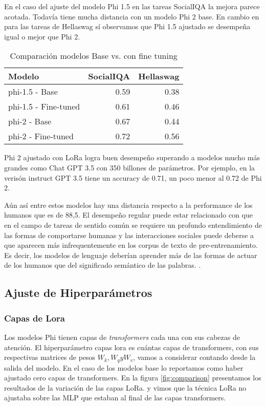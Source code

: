 En el caso del ajuste del modelo Phi 1.5 en las tareas SocialIQA la mejora parece acotada. Todavía tiene mucha distancia con un modelo Phi 2 base. En cambio en para las tareas de Hellaswag sí observamos que Phi 1.5 ajustado se desempeña igual o mejor que Phi 2. \\
\begin{table}[h!]
\centering
\begin{tabular}{lrr}
\toprule
Modelo & SocialIQA & Hellaswag \\
\midrule
phi-1.5 - Base & 0.59 & 0.38 \\
phi-1.5 - Fine-tuned & 0.61 & 0.46 \\
phi-2 - Base & 0.67 & 0.44 \\
phi-2 - Fine-tuned & 0.72 & 0.56 \\
\bottomrule
\end{tabular}

\caption{Comparación modelos Base vs. con fine tuning}
\label{tab:performance_comparison}
\end{table}
Phi 2 ajustado con LoRa logra buen desempeño superando a modelos mucho más grandes como Chat GPT 3.5 con 350 billones de parámetros. Por ejemplo, en la verisón instruct  GPT 3.5 tiene un accuracy de 0.71, un poco menor al 0.72 de Phi 2. 

Aún así entre estos modelos hay una distancia respecto a la performance de los humanos que es de 88,5\cite{bauer2021identify}. El desempeño regular puede estar relacionado con que en el campo de tareas de sentido común se requiere un profundo entendimiento de las formas de comportarse humanas y las interacciones sociales puede deberse a que aparecen más infrequentemente en los corpus de texto de pre-entrenamiento. Es decir, los modelos de lenguaje deberían aprender más de las formas de actuar de los humanos que del significado semántico de las palabras. \cite{bian2024chatgpt}. 

\subsection{Ajuste de Hiperparámetros}
\subsubsection{Capas de Lora}

Los modelos Phi tienen capas de \textit{transformers} cada una con sus cabezas de atención. El hiperparámetro capas lora es cuántas capas de transformers, con sus respectivas matrices de pesos $W_k,W_q y W_v$, vamos a considerar contando desde la salida del modelo. En el caso de los modelos base lo reportamos como haber ajustado cero capas de transformers. En la figura \ref{fig:comparison} presentamos los resultados de la variación de las capas LoRa. y vimos que la técnica LoRa no ajustaba sobre las MLP que estaban al final de las capas transformers. 

